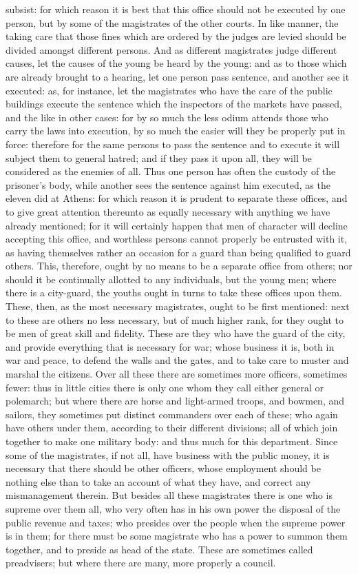 \documentclass[12pt]{article}
\begin{document}
subsist: for which reason it is best that this office should not be executed by one person, but by some of the magistrates of the other courts. In like manner, the taking care that those fines which are ordered by the judges are levied should be divided amongst different persons. And as different magistrates judge different causes, let the causes of the young be heard by the young: and as to those which are already brought to a hearing, let one person pass sentence, and another see it executed: as, for instance, let the magistrates who have the care of the public buildings execute the sentence which the inspectors of the markets have passed, and the like in other cases: for by so much the less odium attends those who carry the laws into execution, by so much the easier will they be properly put in force: therefore for the same persons to pass the sentence and to execute it will subject them to general hatred; and if they pass it upon all, they will be considered as the enemies of all. Thus one person has often the custody of the prisoner's body, while another sees the sentence against him executed, as the eleven did at Athens: for which reason it is prudent to separate these offices, and to give great attention thereunto as equally necessary with anything we have already mentioned; for it will certainly happen that men of character will decline accepting this office, and worthless persons cannot properly be entrusted with it, as having themselves rather an occasion for a guard than being qualified to guard others. This, therefore, ought by no means to be a separate office from others; nor should it be continually allotted to any individuals, but the young men; where there is a city-guard, the youths ought in turns to take these offices upon them. These, then, as the most necessary magistrates, ought to be first mentioned: next to these are others no less necessary, but of much higher rank, for they ought to be men of great skill and fidelity. These are they who have the guard of the city, and provide everything that is necessary for war; whose business it is, both in war and peace, to defend the walls and the gates, and to take care to muster and marshal the citizens. Over all these there are sometimes more officers, sometimes fewer: thus in little cities there is only one whom they call either general or polemarch; but where there are horse and light-armed troops, and bowmen, and sailors, they sometimes put distinct commanders over each of these; who again have others under them, according to their different divisions; all of which join together to make one military body: and thus much for this department. Since some of the magistrates, if not all, have business with the public money, it is necessary that there should be other officers, whose employment should be nothing else than to take an account of what they have, and correct any mismanagement therein. But besides all these magistrates there is one who is supreme over them all, who very often has in his own power the disposal of the public revenue and taxes; who presides over the people when the supreme power is in them; for there must be some magistrate who has a power to summon them together, and to preside as head of the state. These are sometimes called preadvisers; but where there are many, more properly a council. 
\end{document}

